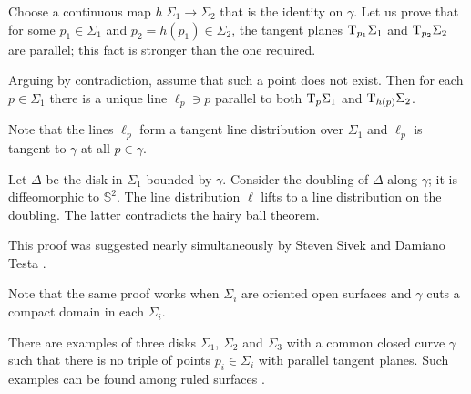 Choose a continuous map $h\:\Sigma_1\to \Sigma_2$
that is the identity on $\gamma$.
Let us prove that for some $p_1\in \Sigma_1$ and $p_2=h(p_1)\in \Sigma_2$,
the tangent planes $\mathrm{T}_{p_1} \Sigma_1$ and  $\mathrm{T}_{p_2} \Sigma_2$ are parallel;
this fact is stronger than the one required.

\medskip

Arguing by contradiction,
assume that such a point does not exist.
Then for each $p\in\Sigma_1$
there is a unique line $\ell_p\ni p$ 
 parallel to both $\mathrm{T}_{p} \Sigma_1$ and $\mathrm{T}_{h(p)} \Sigma_2$.

Note that the lines $\ell_p$ form a tangent line distribution over $\Sigma_1$
and $\ell_p$ is tangent to $\gamma$ at all $p\in\gamma$.

Let $\Delta$ be the disk in $\Sigma_1$ bounded by $\gamma$.
Consider the doubling of $\Delta$ along  $\gamma$;
it is diffeomorphic to $\mathbb S^2$.
The line distribution $\ell$ lifts to a line distribution on the doubling.
The latter contradicts the hairy ball theorem.\qeds


This proof was suggested nearly simultaneously 
by Steven Sivek 
and Damiano Testa \cite{two-disks}.

Note that the same proof works when $\Sigma_i$ are oriented open surfaces and $\gamma$ cuts a compact domain in each $\Sigma_i$.

There are examples of three disks $\Sigma_1$, $\Sigma_2$ and $\Sigma_3$
with a common closed curve $\gamma$ such that there is
no triple of points $p_i\in\Sigma_i$ with parallel tangent planes.
Such examples can be found among ruled surfaces \cite{three-disks}.
